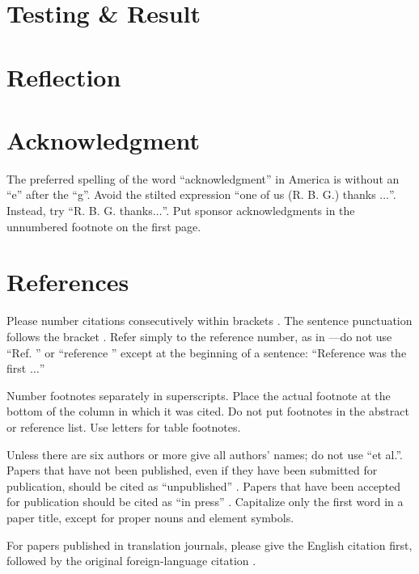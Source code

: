\documentclass[conference]{IEEEtran}
\begin{document}
\section{Testing \& Result}

\section{Reflection}



\section*{Acknowledgment}

The preferred spelling of the word ``acknowledgment'' in America is without 
an ``e'' after the ``g''. Avoid the stilted expression ``one of us (R. B. 
G.) thanks $\ldots$''. Instead, try ``R. B. G. thanks$\ldots$''. Put sponsor 
acknowledgments in the unnumbered footnote on the first page.

\section*{References}

Please number citations consecutively within brackets \cite{b1}. The 
sentence punctuation follows the bracket \cite{b2}. Refer simply to the reference 
number, as in \cite{b3}---do not use ``Ref. \cite{b3}'' or ``reference \cite{b3}'' except at 
the beginning of a sentence: ``Reference \cite{b3} was the first $\ldots$''

Number footnotes separately in superscripts. Place the actual footnote at 
the bottom of the column in which it was cited. Do not put footnotes in the 
abstract or reference list. Use letters for table footnotes.

Unless there are six authors or more give all authors' names; do not use 
``et al.''. Papers that have not been published, even if they have been 
submitted for publication, should be cited as ``unpublished'' \cite{b4}. Papers 
that have been accepted for publication should be cited as ``in press'' \cite{b5}. 
Capitalize only the first word in a paper title, except for proper nouns and 
element symbols.

For papers published in translation journals, please give the English 
citation first, followed by the original foreign-language citation \cite{b6}.
\end{document}
